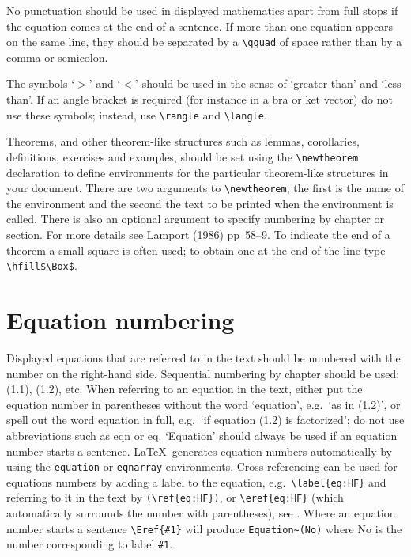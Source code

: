 No punctuation should be used in 
displayed mathematics apart from full stops if 
the equation comes at the end of a sentence. If more than one equation 
appears on the same line, they should be 
separated by a \verb"\qquad" of space 
rather than by a comma or semicolon.

The symbols `$>$' and `$<$' should be used in the sense of `greater 
than' and `less than'. If an angle bracket is required (for instance 
in a bra or ket vector) do not use these symbols; instead, use 
\verb"\rangle" and \verb"\langle". 

Theorems, and other theorem-like structures such as lemmas, corollaries,
definitions, exercises and examples, should be set using the \verb"\newtheorem"
declaration to define environments for the particular theorem-like
structures in your document. There are two arguments to \verb"\newtheorem",
the first is the name of the environment and the second the text to be
printed when the environment is called. There is also an optional argument 
to specify numbering by chapter or section. For more details see Lamport
(1986) pp~58--9.
To indicate the end of a theorem 
a small square is often used; to obtain one at the end of the line 
type \verb"\hfill$\Box$".
 


\section{Equation numbering}
Displayed equations that are referred to in the text should be numbered with 
the number on the right-hand side. 
Sequential numbering by chapter should be 
used: (1.1), (1.2), etc. 
When referring to an equation in the text, either put 
the equation number in parentheses without the word `equation', 
e.g.\ `as in (1.2)', or spell out the 
word equation in full, e.g.\ `if equation (1.2) is factorized'; do not 
use abbreviations such as eqn or eq. `Equation' should always be used 
if an equation number starts a sentence.
\LaTeX\ generates equation numbers automatically by using the
\verb"equation" or \verb"eqnarray" environments. 
Cross referencing can be used
for equations numbers by adding a label to the equation, e.g.\
\verb"\label{eq:HF}" and referring to it in the text by
\verb"(\ref{eq:HF})", or \verb"\eref{eq:HF}" (which automatically surrounds
the number with parentheses), see \eref{eq:hxy}. Where an equation 
number starts a sentence \verb"\Eref{#1}" will produce 
\verb"Equation~(No)" where No is the number corresponding to label 
\verb"#1".




